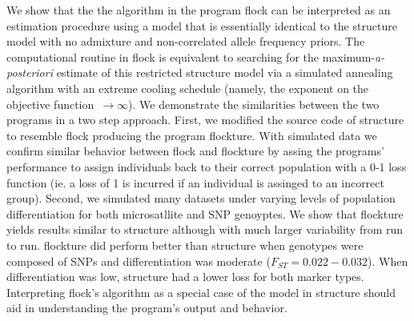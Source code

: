
      We show that the the algorithm in the program {\sc flock} \citep{Duc&Tur2009} can be
interpreted as an estimation procedure using  
a model that is essentially identical to the {\sc structure} 
\citep{Pritchardetal2000} model with no admixture and non-correlated 
allele frequency priors. The computational routine in {\sc flock} is 
equivalent to searching for the maximum-{\em a-posteriori}
estimate of this restricted {\sc structure} model via a simulated 
annealing algorithm with an extreme cooling 
schedule (namely, the exponent on the objective function~$\rightarrow \infty$).  We 
demonstrate the similarities between the two programs in a two step approach. First,
we modified the source code of  {\sc structure} to resemble {\sc flock} producing
the program {\sc flockture}. With simulated data we confirm similar behavior between 
{\sc flock}  and {\sc flockture} by assing the programs' performance
to assign individuals back to their correct population with a 
0-1 loss function (ie. a loss of 1 is incurred if an individual is assinged 
to an incorrect group). Second, we simulated many datasets under varying 
levels of population differentiation for both microsatllite and SNP genoyptes. We show that
{\sc flockture} yields results similar to {\sc structure} although with much larger 
variability from run to run. {\sc flockture} did perform better than {\sc structure} 
when genotypes were composed of SNPs and differentiation was moderate 
($F_{ST}=0.022-0.032$). When differentiation was low, {\sc structure} had a lower loss
for both marker types. Interpreting {\sc flock}'s algorithm as a special case of the model in 
{\sc structure} should aid in understanding the program's output and behavior. 

